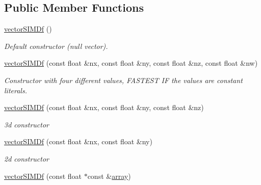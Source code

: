 \subsection*{Public Member Functions}
\begin{DoxyCompactItemize}
\item 
\hyperlink{classirr_1_1core_1_1vectorSIMDf_ad38f456dbd31a650fdd1ee1f22b5c842}{vector\+S\+I\+M\+Df} ()\hypertarget{classirr_1_1core_1_1vectorSIMDf_ad38f456dbd31a650fdd1ee1f22b5c842}{}\label{classirr_1_1core_1_1vectorSIMDf_ad38f456dbd31a650fdd1ee1f22b5c842}

\begin{DoxyCompactList}\small\item\em Default constructor (null vector). \end{DoxyCompactList}\item 
\hyperlink{classirr_1_1core_1_1vectorSIMDf_af0148c9132ea76e8944251615c382719}{vector\+S\+I\+M\+Df} (const float \&nx, const float \&ny, const float \&nz, const float \&nw)\hypertarget{classirr_1_1core_1_1vectorSIMDf_af0148c9132ea76e8944251615c382719}{}\label{classirr_1_1core_1_1vectorSIMDf_af0148c9132ea76e8944251615c382719}

\begin{DoxyCompactList}\small\item\em Constructor with four different values, F\+A\+S\+T\+E\+ST IF the values are constant literals. \end{DoxyCompactList}\item 
\hyperlink{classirr_1_1core_1_1vectorSIMDf_a8dc3b6baa225e5057c4f7e24061b202c}{vector\+S\+I\+M\+Df} (const float \&nx, const float \&ny, const float \&nz)\hypertarget{classirr_1_1core_1_1vectorSIMDf_a8dc3b6baa225e5057c4f7e24061b202c}{}\label{classirr_1_1core_1_1vectorSIMDf_a8dc3b6baa225e5057c4f7e24061b202c}

\begin{DoxyCompactList}\small\item\em 3d constructor \end{DoxyCompactList}\item 
\hyperlink{classirr_1_1core_1_1vectorSIMDf_a1a6ac9b42422df259c5cbcdb676f114c}{vector\+S\+I\+M\+Df} (const float \&nx, const float \&ny)\hypertarget{classirr_1_1core_1_1vectorSIMDf_a1a6ac9b42422df259c5cbcdb676f114c}{}\label{classirr_1_1core_1_1vectorSIMDf_a1a6ac9b42422df259c5cbcdb676f114c}

\begin{DoxyCompactList}\small\item\em 2d constructor \end{DoxyCompactList}\item 
\hyperlink{classirr_1_1core_1_1vectorSIMDf_aee468c673c48c431f6b3ffb191be16cc}{vector\+S\+I\+M\+Df} (const float $\ast$const \&\hyperlink{classirr_1_1core_1_1array}{array})\hypertarget{classirr_1_1core_1_1vectorSIMDf_aee468c673c48c431f6b3ffb191be16cc}{}\label{classirr_1_1core_1_1vectorSIMDf_aee468c673c48c431f6b3ffb191be16cc}


\end{DoxyCompactItemize}
